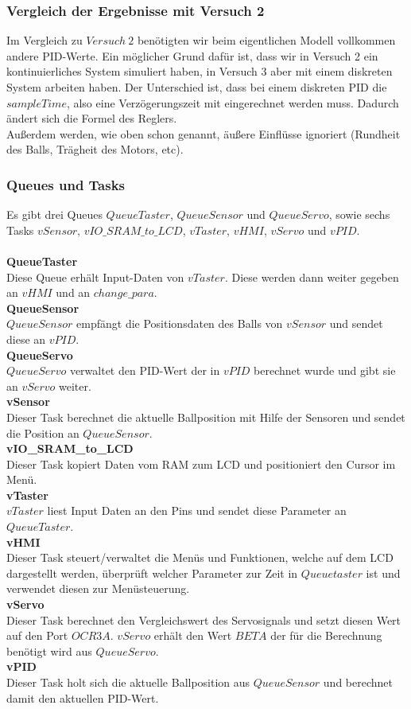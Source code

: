 \subsubsection{Vergleich der Ergebnisse mit Versuch 2}
Im Vergleich zu $Versuch\ 2$ benötigten wir beim eigentlichen Modell vollkommen andere PID-Werte. Ein möglicher Grund dafür ist, dass wir in Versuch 2 ein kontinuierliches System simuliert haben, in Versuch 3 aber mit einem diskreten System arbeiten haben. Der Unterschied ist, dass bei einem diskreten PID die $sampleTime$, also eine Verzögerungszeit mit eingerechnet werden muss. Dadurch ändert sich die Formel des Reglers.\\
Außerdem werden, wie oben schon genannt, äußere Einflüsse ignoriert (Rundheit des Balls, Trägheit des Motors, etc).

\subsubsection{Queues und Tasks}
Es gibt drei Queues $QueueTaster$, $QueueSensor$ und $QueueServo$, sowie sechs Tasks $vSensor$, $vIO\_SRAM\_to\_LCD$, $vTaster$, $vHMI$, $vServo$ und $vPID$.\\
\\
{\bfseries QueueTaster}\\
Diese Queue erhält Input-Daten von $vTaster$. Diese werden dann weiter gegeben an $vHMI$ und an $change\_para$.\\
{\bfseries QueueSensor} \\
$QueueSensor$ empfängt die Positionsdaten des Balls von $vSensor$ und sendet diese an $vPID$.\\
{\bfseries QueueServo} \\
$QueueServo$ verwaltet den PID-Wert der in $vPID$ berechnet wurde und gibt sie an $vServo$ weiter.\\
{\bfseries vSensor} \\
Dieser Task berechnet die aktuelle Ballposition mit Hilfe der Sensoren und sendet die Position an $QueueSensor$.\\
{\bfseries vIO\_SRAM\_to\_LCD} \\
Dieser Task kopiert Daten vom RAM zum LCD und positioniert den Cursor im Menü.\\
{\bfseries vTaster} \\
$vTaster$ liest Input Daten an den Pins und sendet diese Parameter an $QueueTaster$.\\
{\bfseries vHMI} \\
Dieser Task steuert/verwaltet die Menüs und Funktionen, welche auf dem LCD dargestellt werden, überprüft welcher Parameter zur Zeit in $Queuetaster$ ist und verwendet diesen zur Menüsteuerung.\\
{\bfseries vServo} \\
Dieser Task berechnet den Vergleichswert des Servosignals und setzt diesen Wert auf den Port $OCR3A$. $vServo$ erhält den Wert $BETA$ der für die Berechnung benötigt wird aus $QueueServo$.\\
{\bfseries vPID} \\
Dieser Task holt sich die aktuelle Ballposition aus $QueueSensor$ und berechnet damit den aktuellen PID-Wert.\\


